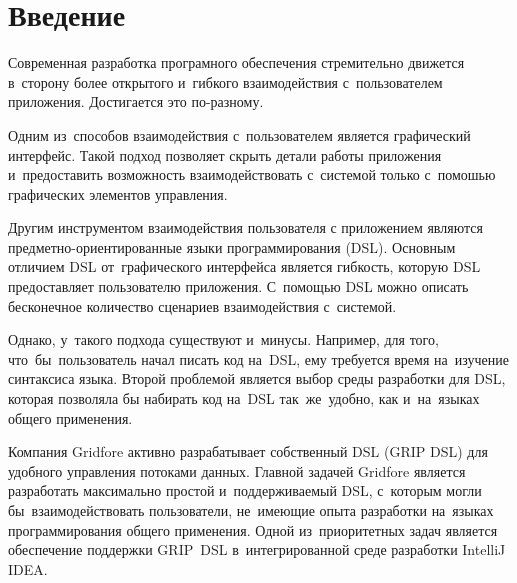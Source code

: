 \chapter*{Введение}                         %



Современная разработка програмного обеспечения стремительно движется в~сторону более открытого и~гибкого взаимодействия с~пользователем приложения.
Достигается это по-разному. 

Одним из~способов взаимодействия с~пользователем является графический интерфейс. Такой подход позволяет скрыть детали работы приложения и~предоставить возможность взаимодействовать с~системой только с~помошью графических элементов управления.

Другим инструментом взаимодействия пользователя с приложением являются предметно-ориентированные языки программирования (DSL). Основным отличием DSL от~графического интерфейса является гибкость, которую DSL предоставляет пользователю приложения. С~помощью DSL можно описать бесконечное количество сценариев взаимодействия с~системой. 

Однако, у~такого подхода существуют и~минусы. Например, для того, что~бы~пользователь начал писать код на~DSL, ему требуется время на~изучение синтаксиса языка. Второй проблемой является выбор среды разработки для DSL, которая позволяла бы набирать код на~DSL так~же~удобно, как и~на~языках общего применения. 

Компания Gridfore активно разрабатывает собственный DSL (GRIP DSL) для удобного управления потоками данных. Главной задачей Gridfore является разработать максимально простой и~поддерживаемый DSL, с~которым могли бы~взаимодействовать пользователи, не~имеющие опыта разработки на~языках программирования общего применения. Одной из~приоритетных задач является обеспечение поддержки GRIP~DSL в~интегрированной среде разработки IntelliJ IDEA.  

%
